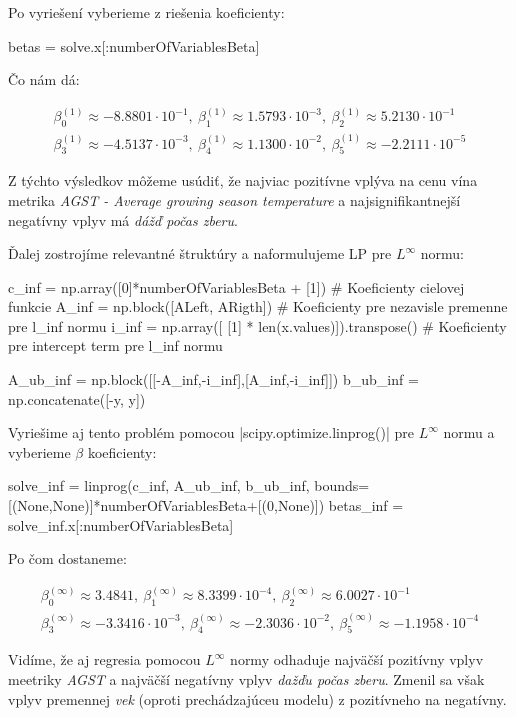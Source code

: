 \documentclass[report.tex]{subfiles}
\begin{document}
Po vyriešení vyberieme z riešenia koeficienty:

\begin{python}
betas = solve.x[:numberOfVariablesBeta]
\end{python}

Čo nám dá: 

\begin{gather*}
	\beta_0^{(1)} \approx -8.8801 \cdot 10^{-1} ,~\beta_1^{(1)} \approx 1.5793\cdot 10^{-3},~\beta_2^{(1)} \approx 5.2130\cdot 10^{-1} \\
	\beta_3^{(1)} \approx -4.5137\cdot 10^{-3} ,~\beta_4^{(1)} \approx 1.1300\cdot 10^{-2}  ,~\beta_5^{(1)} \approx -2.2111\cdot 10^{-5}
\end{gather*}

Z týchto výsledkov môžeme usúdiť, že najviac pozitívne vplýva na cenu vína metrika \textit{AGST - Average growing season temperature} a najsignifikantnejší negatívny vplyv má \textit{dážď počas zberu}.


\newpage

Ďalej zostrojíme relevantné štruktúry a naformulujeme LP pre $L^{\infty}$ normu:

\begin{python}
c_inf = np.array([0]*numberOfVariablesBeta + [1]) # Koeficienty cielovej funkcie
A_inf = np.block([ALeft, ARigth]) # Koeficienty pre nezavisle premenne pre l_inf normu
i_inf = np.array([ [1] * len(x.values)]).transpose() # Koeficienty pre intercept term pre l_inf normu

A_ub_inf = np.block([[-A_inf,-i_inf],[A_inf,-i_inf]])
b_ub_inf = np.concatenate([-y, y]) 
\end{python}

Vyriešime aj tento problém pomocou \pyth|scipy.optimize.linprog()| pre $L^{\infty}$ normu a vyberieme $\beta$ koeficienty:

\begin{python}
solve_inf = linprog(c_inf, A_ub_inf, b_ub_inf, bounds=[(None,None)]*numberOfVariablesBeta+[(0,None)])
betas_inf = solve_inf.x[:numberOfVariablesBeta]
\end{python}

Po čom dostaneme:

\begin{gather*}
	\beta_0^{(\infty)} \approx  3.4841 ,~\beta_1^{(\infty)} \approx 8.3399\cdot 10^{-4} ,~\beta_2^{(\infty)} \approx 6.0027\cdot 10^{-1} \\
	\beta_3^{(\infty)} \approx -3.3416\cdot 10^{-3} ,~\beta_4^{(\infty)} \approx -2.3036\cdot 10^{-2}  ,~\beta_5^{(\infty)} \approx -1.1958\cdot 10^{-4}
\end{gather*}

Vidíme, že aj regresia pomocou $L^{\infty}$ normy odhaduje najväčší pozitívny vplyv meetriky \textit{AGST} a najväčší negatívny vplyv \textit{dažďu počas zberu}. Zmenil sa však vplyv premennej \textit{vek} (oproti prechádzajúceu modelu) z pozitívneho na negatívny.
\end{document}
